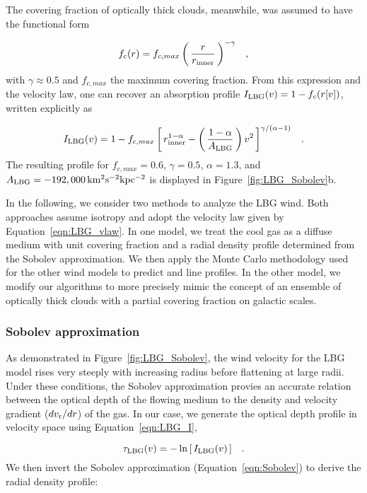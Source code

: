 \documentclass[12pt,preprint]{aastex}
\begin{document}
The covering fraction of optically thick clouds, meanwhile, was assumed to have
the functional form

\begin{equation}
f_c(r) = f_{c,max} \left ( \, \frac{r}{r_{\rm inner}} \, \right )^{-\gamma} \;\;\; ,
\label{eqn:covering}
\end{equation}
with $\gamma \approx 0.5$ and $f_{c,max}$ the maximum covering
fraction.  From this expression and the velocity law, one can recover
an absorption profile $I_{\rm LBG}(v) = 1 - f_c(r[v])$, written
explicitly as

\begin{equation}
I_{\rm LBG}(v) = 1 - f_{c,max} \left [ \, r_{\rm inner}^{1-\alpha} - \left ( \,
\frac{1-\alpha}{A_{\rm LBG}} \, \right ) v^2 \, \right ]^{\gamma/(\alpha-1)}
\;\;\; .
\label{eqn:LBG_I}
\end{equation}
The resulting profile for $f_{c,max} = 0.6$, $\gamma=0.5$,
$\alpha=1.3$, and $A_{\rm LBG} = -192,000 \, \rm km^2 s^{-2} kpc^{-2}$ 
is displayed in Figure~\ref{fig:LBG_Sobolev}b.  

In the following, we consider two methods to analyze the LBG wind.
Both approaches assume isotropy and adopt the velocity law given by
Equation~\ref{eqn:LBG_vlaw}.  In one model, we treat the cool gas as a
diffuse medium with unit covering fraction and a radial density
profile determined from the Sobolev approximation.  We then apply 
the Monte Carlo methodology used for the other wind models to predict
 and  line profiles.  In the other model,
we modify our algorithms to more precisely mimic the concept of an
ensemble of optically thick clouds with a partial covering fraction on
galactic scales.

\subsubsection{Sobolev approximation}
\label{sec:Sobolev}

As demonstrated in Figure~\ref{fig:LBG_Sobolev}, the wind velocity for
the LBG model rises very steeply with increasing radius before
flattening at large radii.  Under these conditions, the Sobolev
approximation provies an accurate relation between the optical depth
of the flowing medium to the
density and velocity gradient ($dv_{\rm r}/dr$) of the gas.  In our case, we 
generate the optical depth profile in velocity space using Equation~\ref{eqn:LBG_I}, 

\begin{equation}
\tau_{\rm LBG}(v) = -\ln \left [ \, I_{\rm LBG}(v) \, \right ] \;\;\; .
\label{eqn:tauLBG}
\end{equation}
We then invert the Sobolev approximation (Equation~\ref{eqn:Sobolev})
to derive the radial density profile:
\end{document}
